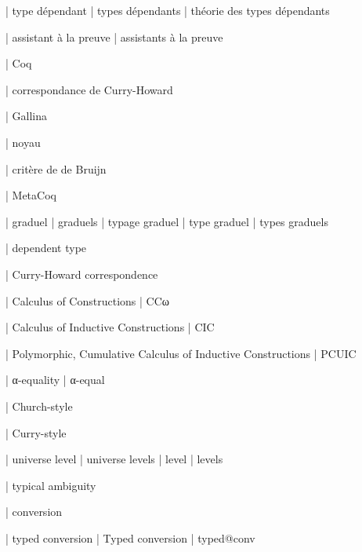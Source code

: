 




  | type dépendant
  | types dépendants
  | théorie des types dépendants

  | assistant à la preuve
  | assistants à la preuve

  | Coq

  | correspondance de Curry-Howard

  | Gallina

  | noyau

  | critère de de Bruijn

  | MetaCoq

  | graduel
  | graduels
  | typage graduel
  | type graduel
  | types graduels


  | dependent type

  | Curry-Howard correspondence


  | Calculus of Constructions
  | CCω

  | Calculus of Inductive Constructions
  | CIC

  | Polymorphic, Cumulative Calculus of Inductive Constructions
  | PCUIC

  | α-equality
  | α-equal 

  | Church-style

  | Curry-style

  | universe level
  | universe levels
  | level
  | levels

  | typical ambiguity

  | conversion

  | typed conversion
  | Typed conversion
  | typed@conv

